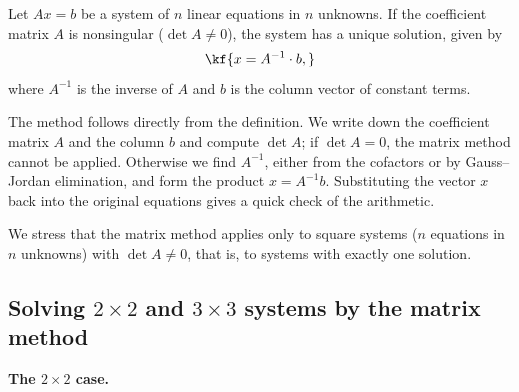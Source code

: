 
\begin{tarif}
Let $Ax = b$ be a system of $n$ linear equations in $n$ unknowns. If the
coefficient matrix $A$ is nonsingular ($\det A \neq 0$), the system has a
unique solution, given by
\[\kf{x = A^{-1}\cdot b,}\]
where $A^{-1}$ is the inverse of $A$ and $b$ is the column vector of
constant terms.
\end{tarif}

The method follows directly from the definition. We write down the
coefficient matrix $A$ and the column $b$ and compute $\det A$; if
$\det A = 0$, the matrix method cannot be applied. Otherwise we find
$A^{-1}$, either from the cofactors or by Gauss–Jordan elimination, and
form the product $x = A^{-1}b$. Substituting the vector $x$ back into the
original equations gives a quick check of the arithmetic.

We stress that the matrix method applies only to square systems
($n$ equations in $n$ unknowns) with $\det A \neq 0$, that is, to systems
with exactly one solution.

\subsection{Solving $2\times 2$ and $3\times 3$ systems by the matrix method}

\textbf{The $2\times 2$ case.}


